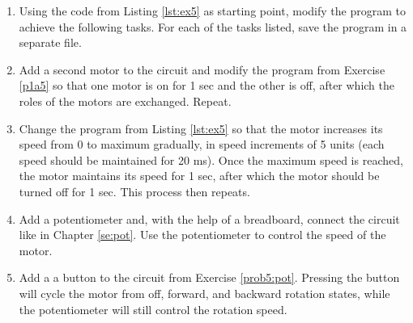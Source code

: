 \documentclass[12pt]{book}
\begin{document}
\begin{enumerate}[1.]
\item\label{p1a5} Using the code from Listing \ref*{lst:ex5} as starting point,
  modify the program to achieve the following tasks. For each of the
  tasks listed, save the program in a separate file.


\item Add a second motor to the circuit and modify the program from
  Exercise \ref*{p1a5} so that one motor is on for 1 sec and the other
  is off, after which the roles of the motors are exchanged. Repeat.

\item\label{prob5:grad} Change the program from Listing \ref*{lst:ex5} so that the motor
  increases its speed from $0$ to maximum gradually, in speed
  increments of 5 units (each speed should be maintained for 20
  ms). Once the maximum speed is reached, the motor maintains its
  speed for 1 sec, after which the motor should be turned off for 1
  sec.  This process 
  then repeats.

\item\label{prob5:pot} Add a potentiometer and, with the help of a breadboard, connect
  the circuit like in Chapter \ref{se:pot}. Use the potentiometer to
  control the speed of the motor. 

\item\label{prob5:but} Add a a button to the circuit from Exercise
  \ref{prob5:pot}. Pressing the button will cycle the motor from off,
  forward, and backward rotation states, while the potentiometer will
  still control the rotation speed.


\end{enumerate}
\end{document}
